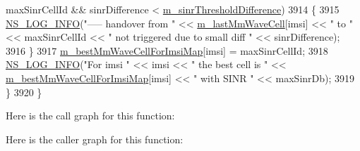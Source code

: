 \begin{DoxyCode}
      maxSinrCellId && sinrDifference < \hyperlink{classns3_1_1LteEnbRrc_aef56a65c644f6ed3c5f28a540ded624f}{m\_sinrThresholdDifference})
3914     \{
3915       \hyperlink{group__logging_gafbd73ee2cf9f26b319f49086d8e860fb}{NS\_LOG\_INFO}(\textcolor{stringliteral}{"----- handover from "} << \hyperlink{classns3_1_1LteEnbRrc_a0d7b04f0383b0dc3f6a7360b87cbaeee}{m\_lastMmWaveCell}[imsi] << \textcolor{stringliteral}{" to "} << 
      maxSinrCellId << \textcolor{stringliteral}{" not triggered due to small diff "} << sinrDifference);
3916     \}
3917     \hyperlink{classns3_1_1LteEnbRrc_a38d5bf3d53b16596824f07d4b4a1eab7}{m\_bestMmWaveCellForImsiMap}[imsi] = maxSinrCellId;
3918     \hyperlink{group__logging_gafbd73ee2cf9f26b319f49086d8e860fb}{NS\_LOG\_INFO}(\textcolor{stringliteral}{"For imsi "} << imsi << \textcolor{stringliteral}{" the best cell is "} << 
      \hyperlink{classns3_1_1LteEnbRrc_a38d5bf3d53b16596824f07d4b4a1eab7}{m\_bestMmWaveCellForImsiMap}[imsi] << \textcolor{stringliteral}{" with SINR "} << maxSinrDb);
3919   \}
3920 \}
\end{DoxyCode}


Here is the call graph for this function\+:




Here is the caller graph for this function\+:


